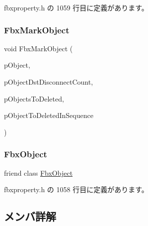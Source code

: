  fbxproperty.\+h の 1059 行目に定義があります。

\mbox{\label{class_fbx_property_a08fc1df47ff71ef2c17871f8e95ab2d6}} 
\subsubsection{\texorpdfstring{Fbx\+Mark\+Object}{FbxMarkObject}}
{\footnotesize\ttfamily void Fbx\+Mark\+Object (\begin{DoxyParamCaption}\item[{\hyperlink{class_fbx_object}{Fbx\+Object} $\ast$}]{p\+Object,  }\item[{\hyperlink{class_fbx_map}{Fbx\+Map}$<$ \hyperlink{class_fbx_object}{Fbx\+Object} $\ast$, int $>$ \&}]{p\+Object\+Dst\+Disconnect\+Count,  }\item[{\hyperlink{class_fbx_set}{Fbx\+Set}$<$ \hyperlink{class_fbx_object}{Fbx\+Object} $\ast$$>$ \&}]{p\+Objects\+To\+Deleted,  }\item[{\hyperlink{class_fbx_array}{Fbx\+Array}$<$ \hyperlink{class_fbx_object}{Fbx\+Object} $\ast$$>$ \&}]{p\+Object\+To\+Deleted\+In\+Sequence }\end{DoxyParamCaption})\hspace{0.3cm}{\ttfamily [friend]}}

\mbox{\label{class_fbx_property_a7ea6fa004b54d9c3cd5b85fd33328078}} 
\subsubsection{\texorpdfstring{Fbx\+Object}{FbxObject}}
{\footnotesize\ttfamily friend class \hyperlink{class_fbx_object}{Fbx\+Object}\hspace{0.3cm}{\ttfamily [friend]}}



 fbxproperty.\+h の 1058 行目に定義があります。



\subsection{メンバ詳解}
\mbox{\label{class_fbx_property_a4b55a5fb0b5e63c3db166e64f38bec1d}} 
